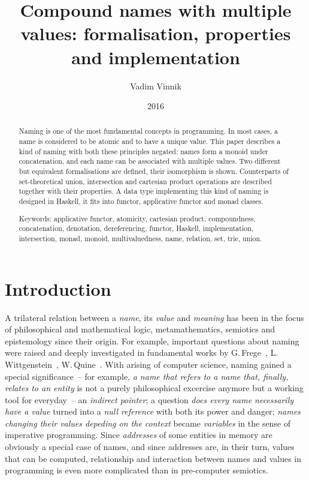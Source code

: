 \documentclass{article}
\title{Compound names with multiple values: formalisation, properties and implementation}
\author{Vadim Vinnik}
\date{2016}
\theoremstyle{definition}
\begin{document}
\maketitle

\begin{abstract}
Naming is one of the most fundamental concepts in programming.  In most
cases, a name is considered to be atomic and to have a unique value.  This
paper describes a kind of naming with both these principles negated: names form
a monoid under concatenation, and each name can be associated with multiple
values.  Two different but equivalent formalisations are defined, their
isomorphism is shown.  Counterparts of set-theoretical union, intersection and
cartesian product operations are described together with their properties.  A
data type implementing this kind of naming is designed in Haskell, it fits into
functor, applicative functor and monad classes.

Keywords:
applicative functor,
atomicity,
cartesian product,
compoundness,
concatenation,
denotation,
dereferencing,
functor,
Haskell,
implementation,
intersection,
monad,
monoid,
multivaluedness,
name,
relation,
set,
trie,
union.
\end{abstract}



\tableofcontents



\section{Introduction}

A trilateral relation between a \emph{name}, its \emph{value} and
\emph{meaning} has been in the focus of philosophical and mathematical logic,
metamathematics, semiotics and epistemology since their origin.
For example, important questions
about naming were raised and deeply investigated in fundamental works by
G.\,Frege~\cite{bib:frege},
L.\,Wittgenstein~\cite{bib:wittgenstein},
W.\,Quine~\cite{bib:quine}.
With arising of computer science, naming gained a special significance~-- for
example, \emph{a name that refers to a name that, finally, relates to an
entity} is not a purely philosophical excercise anymore but a working tool for
everyday~-- an \emph{indirect pointer}; a question \emph{does every name
necessarily have a value} turned into a \emph{null reference} with both its
power and danger; \emph{names changing their values depeding on the context}
became \emph{variables} in the sense of imperative programming. Since
\emph{addresses} of some entities in memory are obviously a special case of
names, and since addresses are, in their turn, values that can be computed,
relationship and interaction between names and values in programming is even
more complicated than in pre-computer semiotics.
\end{document}
